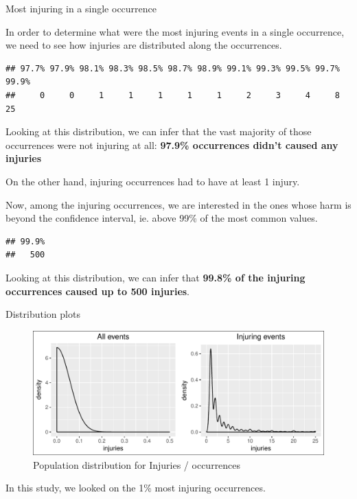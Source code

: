 \documentclass[]{article}
\begin{document}
Most injuring in a single occurrence

In order to determine what were the most injuring events in a single
occurrence, we need to see how injuries are distributed along the
occurrences.

\begin{verbatim}
## 97.7% 97.9% 98.1% 98.3% 98.5% 98.7% 98.9% 99.1% 99.3% 99.5% 99.7% 99.9% 
##     0     0     1     1     1     1     1     2     3     4     8    25
\end{verbatim}

Looking at this distribution, we can infer that the vast majority of
those occurrences were not injuring at all: \textbf{97.9\% occurrences
didn't caused any injuries}

On the other hand, injuring occurrences had to have at least 1 injury.

Now, among the injuring occurrences, we are interested in the ones whose
harm is beyond the confidence interval, ie. above 99\% of the most
common values.

\begin{verbatim}
## 99.9% 
##   500
\end{verbatim}

Looking at this distribution, we can infer that \textbf{99.8\% of the
injuring occurrences caused up to 500 injuries}.

Distribution plots

\begin{figure}[htbp]
\centering
\includegraphics{readme_files/figure-latex/inj-distribution-1.pdf}
\caption{Population distribution for Injuries / occurrences}
\end{figure}

In this study, we looked on the 1\% most injuring occurrences.
\end{document}
